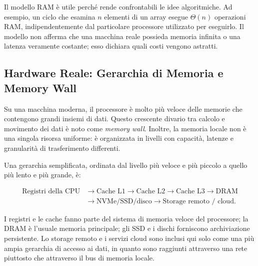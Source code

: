 Il modello RAM è utile perché rende confrontabili le idee algoritmiche. Ad esempio, un ciclo che esamina $n$ elementi di un array esegue $\Theta(n)$ operazioni RAM, indipendentemente dal particolare processore utilizzato per eseguirlo. Il modello non afferma che una macchina reale possieda memoria infinita o una latenza veramente costante; esso dichiara quali costi vengono astratti.

\FloatBarrier
\subsection{Hardware Reale: Gerarchia di Memoria e Memory Wall}

Su una macchina moderna, il processore è molto più veloce delle memorie che contengono grandi insiemi di dati. Questo crescente divario tra calcolo e movimento dei dati è noto come \emph{memory wall}. Inoltre, la memoria locale non è una singola risorsa uniforme: è organizzata in livelli con capacità, latenze e granularità di trasferimento differenti.

Una gerarchia semplificata, ordinata dal livello più veloce e più piccolo a quello più lento e più grande, è:

\[
\begin{aligned}
  \text{Registri della CPU}
    &\longrightarrow \text{Cache L1}
    \longrightarrow \text{Cache L2}
    \longrightarrow \text{Cache L3}
    \longrightarrow \text{DRAM} \\
    &\longrightarrow \text{NVMe/SSD/disco}
    \longrightarrow \text{Storage remoto / cloud}.
\end{aligned}
\]

I registri e le cache fanno parte del sistema di memoria veloce del processore; la DRAM è l'usuale memoria principale; gli SSD e i dischi forniscono archiviazione persistente. Lo storage remoto e i servizi cloud sono inclusi qui solo come una più ampia gerarchia di accesso ai dati, in quanto sono raggiunti attraverso una rete piuttosto che attraverso il bus di memoria locale.

